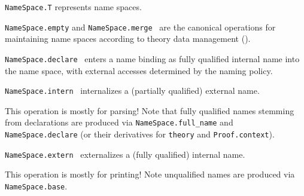 \begin{isabellebody}
\begin{isamarkuptext}
\begin{description}
  \item \verb|NameSpace.T| represents name spaces.

  \item \verb|NameSpace.empty| and \verb|NameSpace.merge|~ are the canonical operations for
  maintaining name spaces according to theory data management
  ().

  \item \verb|NameSpace.declare|~ enters a
  name binding as fully qualified internal name into the name space,
  with external accesses determined by the naming policy.

  \item \verb|NameSpace.intern|~ internalizes a
  (partially qualified) external name.

  This operation is mostly for parsing!  Note that fully qualified
  names stemming from declarations are produced via \verb|NameSpace.full_name| and \verb|NameSpace.declare|
  (or their derivatives for \verb|theory| and
  \verb|Proof.context|).

  \item \verb|NameSpace.extern|~ externalizes a
  (fully qualified) internal name.

  This operation is mostly for printing!  Note unqualified names are
  produced via \verb|NameSpace.base|.

  \end{description}%
\end{isamarkuptext}%
\isamarkuptrue%
%
\endisatagmlref
{\isafoldmlref}%
%
\isadelimmlref
%
\endisadelimmlref
%
\isadelimtheory
%
\endisadelimtheory
%
\isatagtheory
{}\isamarkupfalse%
%
\endisatagtheory
{\isafoldtheory}%
%
\isadelimtheory
%
\endisadelimtheory
\isanewline
\end{isabellebody}%
